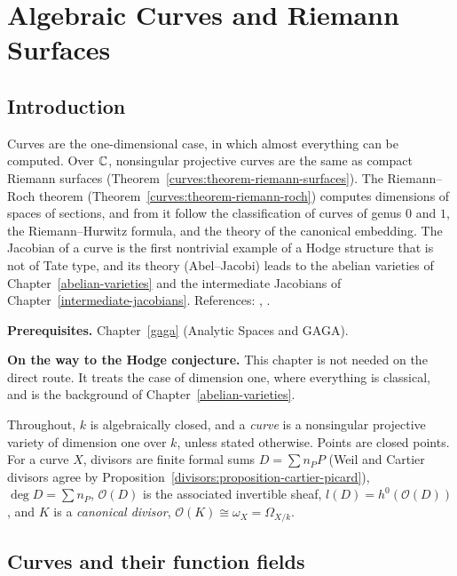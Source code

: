 \chapter{Algebraic Curves and Riemann Surfaces}\label{curves}

\section{Introduction}\label{curves:section-introduction}

Curves are the one-dimensional case, in which almost everything can be computed. Over $\mathbb{C}$, nonsingular projective curves are the same as
compact Riemann surfaces (Theorem~\ref{curves:theorem-riemann-surfaces}). The Riemann--Roch theorem (Theorem~\ref{curves:theorem-riemann-roch})
computes dimensions of spaces of sections, and from it follow the classification of curves of genus $0$ and $1$, the Riemann--Hurwitz formula, and the
theory of the canonical embedding. The Jacobian of a curve is the first nontrivial example of a Hodge structure that is not of Tate type, and its theory
(Abel--Jacobi) leads to the abelian varieties of Chapter~\ref{abelian-varieties} and the intermediate Jacobians of Chapter~\ref{intermediate-jacobians}.
References: \cite[Chapter IV]{hartshorne-ag}, \cite[Chapter 2]{griffiths-harris}.

\noindent\textbf{Prerequisites.} Chapter~\ref{gaga} (Analytic Spaces and GAGA).

\noindent\textbf{On the way to the Hodge conjecture.} This chapter is not needed on the direct route. It treats the case of dimension one, where everything is classical, and is the background of
Chapter~\ref{abelian-varieties}.

Throughout, $k$ is algebraically closed, and a \emph{curve} is a nonsingular projective variety of dimension one over $k$, unless stated otherwise. Points are closed
points. For a curve $X$, divisors are finite formal sums $D = \sum n_PP$ (Weil and Cartier divisors agree by Proposition~\ref{divisors:proposition-cartier-picard}),
$\deg D = \sum n_P$, $\mathcal{O}(D)$ is the associated invertible sheaf, $l(D) = h^0(\mathcal{O}(D))$, and $K$ is a \emph{canonical divisor}, $\mathcal{O}(K) \cong \omega_X = \Omega_{X/k}$.

\section{Curves and their function fields}\label{curves:section-function-fields}

